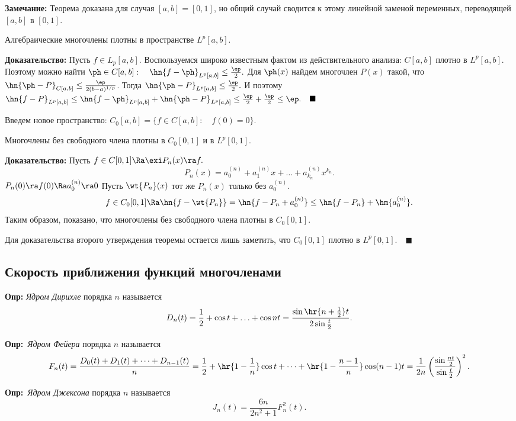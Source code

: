 \documentclass[a4paper]{article}
\def\defin{\noindent\textbf{Опр:}\ }
\begin{document}
\noindent\textbf{Замечание:} Теорема доказана для случая
$[a,b]=[0,1]$, но общий случай сводится к этому линейной заменой
переменных, переводящей $[a,b]$ в $[0,1]$.

\begin{theorems} Алгебраические многочлены плотны в
пространстве $L^p[a,b]$.
\end{theorems}
\textbf{Доказательство:} Пусть $f\in L_p[a,b]$. Воспользуемся
широко известным фактом из действительного анализа: $C[a,b]$
плотно в $L^p[a,b]$. Поэтому можно найти $\ph\in C[a,b]:\quad
\hn{f-\ph}_{L^p[a,b]}\le\frac{\ep}{2}.$ Для $\ph(x)$
найдем многочлен $P(x)$ такой, что
$\hn{\ph-P}_{C[a,b]}\le\frac{\ep}{2(b-a)^{1/p}}$. Тогда
$\hn{\ph-P}_{L^p[a,b]}\le\frac{\ep}2.$ И поэтому
$\hn{f-P}_{L^p[a,b]}\le\hn{f-\ph}_{L^p[a,b]}+\hn{\ph-P}_{L^p[a,b]}\le\frac{\ep}2+\frac{\ep}2\le\ep.\quad\blacksquare$

\medskip Введем новое пространство: $C_0[a,b]=\{f\in C[a,b]:\quad f(0)=0\}$.

\begin{theorems}
Многочлены без свободного члена плотны в $C_0[0,1]$ и в
$L^p[0,1]$.
\end{theorems}
\textbf{Доказательство:} Пусть $f\in C[0,1]\Ra\exi
P_n(x)\ra f.$
$$P_n(x)=a_0^{(n)}+a_1^{(n)}x+\ldots+a_{k_n}^{(n)}x^{k_n}.$$
$P_n(0)\ra f(0)\Ra a_0^{(n)}\ra 0$ Пусть
$\wt{P_n}(x)$ тот же $P_n(x)$ только без $a_0^{(n)}$.
$$f\in
C_0[0,1]\Ra\hn{f-\wt{P_n}}=\hn{f-P_n+a_0^{(n)}}\le\hn{f-P_n}+\hm{a_0^{(n)}}.$$
Таким образом, показано, что многочлены без свободного члена
плотны в $C_0[0,1].$

Для доказательства второго утверждения теоремы остается лишь
заметить, что $C_0[0,1]$ плотно в $L^p[0,1].\quad\blacksquare$

\subsection{Скорость приближения функций многочленами}
\textbf{Опр:} \emph{Ядром Дирихле} порядка $n$ называется
$$D_n(t)=\frac12+\cos t+\ldots+\cos nt=\frac{\sin\hr{n+\frac12}t}{2\sin \frac t2}.$$

\defin \emph{Ядром Фейера} порядка $n$ называется
\begin{multline*}
F_n(t)=\frac{D_0(t)+D_1(t)+\dots+D_{n-1}(t)}{n}=\frac12+\hr{1-\frac1n}\cos
t+\dots+\hr{1-\frac{n-1}{n}}\cos
(n-1)t=\frac1{2n}\left(\frac{\sin \frac{nt}2}{\sin\frac t2}\right)^2.
\end{multline*}

\defin \emph{Ядром Джексона} порядка $n$
называется
$$J_n(t)=\frac{6n}{2n^2+1}F_n^2(t).$$
\end{document}
